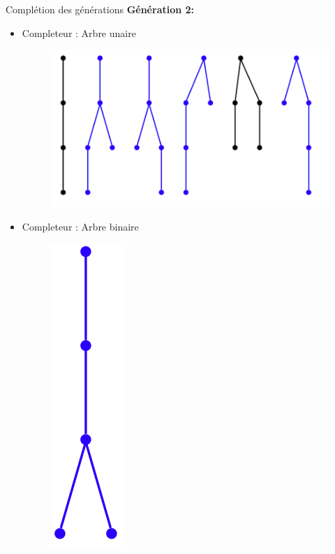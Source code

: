 \documentclass{beamer}
\begin{document}
\begin{frame}{Complétion des générations}
\textbf{Génération 2:}\\
\begin{itemize}
\item  Completeur : Arbre unaire
\begin{figure}[h]
  \centering
  \includegraphics[scale=0.17]{gen2-1.png}
\end{figure}
\item Completeur : Arbre binaire
\begin{figure}[h]
  \centering
  \includegraphics[scale=0.17]{gen2-2.png}
\end{figure}
\end{itemize}
\end{frame}
\end{document}

